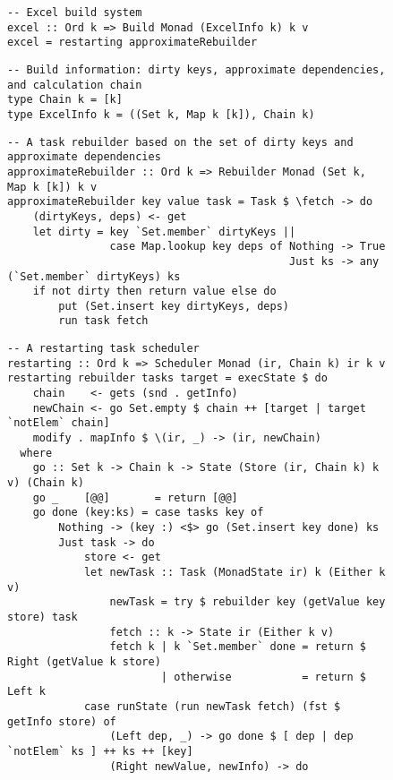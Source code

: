 \begin{figure}
\begin{verbatim}
-- Excel build system
excel :: Ord k => Build Monad (ExcelInfo k) k v
excel = restarting approximateRebuilder
\end{verbatim}
\vspace{0mm}
\begin{verbatim}
-- Build information: dirty keys, approximate dependencies, and calculation chain
type Chain k = [k]
type ExcelInfo k = ((Set k, Map k [k]), Chain k)
\end{verbatim}
\vspace{0mm}
\begin{verbatim}
-- A task rebuilder based on the set of dirty keys and approximate dependencies
approximateRebuilder :: Ord k => Rebuilder Monad (Set k, Map k [k]) k v
approximateRebuilder key value task = Task $ \fetch -> do
    (dirtyKeys, deps) <- get
    let dirty = key `Set.member` dirtyKeys ||
                case Map.lookup key deps of Nothing -> True
                                            Just ks -> any (`Set.member` dirtyKeys) ks
    if not dirty then return value else do
        put (Set.insert key dirtyKeys, deps)
        run task fetch
\end{verbatim}
\vspace{0mm}
\begin{verbatim}
-- A restarting task scheduler
restarting :: Ord k => Scheduler Monad (ir, Chain k) ir k v
restarting rebuilder tasks target = execState $ do
    chain    <- gets (snd . getInfo)
    newChain <- go Set.empty $ chain ++ [target | target `notElem` chain]
    modify . mapInfo $ \(ir, _) -> (ir, newChain)
  where
    go :: Set k -> Chain k -> State (Store (ir, Chain k) k v) (Chain k)
    go _    [@@]       = return [@@]
    go done (key:ks) = case tasks key of
        Nothing -> (key :) <$> go (Set.insert key done) ks
        Just task -> do
            store <- get
            let newTask :: Task (MonadState ir) k (Either k v)
                newTask = try $ rebuilder key (getValue key store) task
                fetch :: k -> State ir (Either k v)
                fetch k | k `Set.member` done = return $ Right (getValue k store)
                        | otherwise           = return $ Left k
            case runState (run newTask fetch) (fst $ getInfo store) of
                (Left dep, _) -> go done $ [ dep | dep `notElem` ks ] ++ ks ++ [key]
                (Right newValue, newInfo) -> do

\end{verbatim}
\end{figure}
